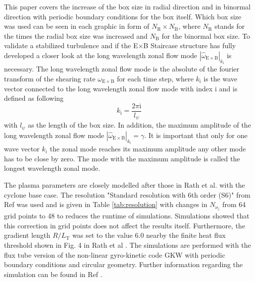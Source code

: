 \documentclass[aip, amsmath, amssymb, reprint, twocolumn]{revtex4-1}
\begin{document}
This paper covers the increase of the box size in radial direction and in binormal direction with periodic boundary conditions for the box itself. Which box size was used can be seen in each graphic in form of $N_\mathrm{R}\times N_\mathrm{B}$, where $N_\mathrm{R}$ stands for the times the radial box size was increased and $N_\mathrm{B}$ for the binormal box size. To validate a stabilized turbulence and if the E$\times$B Staircase structure has fully developed a closer look at the long wavelength zonal flow mode $|\hat{\omega}_{\mathrm{E\times B}}|_{k_\mathrm{i}}$ is necessary. The long wavelength zonal flow mode is the absolute of the fourier transform of the shearing rate $\omega_{\mathrm{E \times B}}$ for each time step, where $k_\mathrm{i}$ is the wave vector connected to the long wavelength zonal flow mode with index i and is defined as following
\begin{equation}
	k_\mathrm{i} = \frac{2\pi \mathrm{i}}{l_\psi}
\end{equation}
with $l_\psi$ as the length of the box size. In addition, the maximum amplitude of the long wavelength zonal flow mode  $|\hat{\omega}_{\mathrm{E\times B}}|_{k_\mathrm{i}} = \gamma $. \cite{doi:10.1063/1.4961231} It is important that only for one wave vector $k_i$ the zonal mode reaches its maximum amplitude any other mode has to be close by zero. The mode with the maximum amplitude is called the longest wavelength zonal mode. \bigskip



The plasma parameters are closely modelled after those in Rath et al. \cite{doi:10.1063/1.4961231} with the cyclone base case.
The resolution "Standard resolution with 6th order (S6)" from Ref  was used and is given in Table \ref{tab:resolution} with changes in $N_{\nu_\parallel}$ from 64 grid points to 48 to reduces the runtime of simulations. Simulations showed that this correction in grid points does not affect the results itself. Furthermore, the gradient length $R/L_\mathrm{T}$ was set to the value 6.0 nearby the finite heat flux threshold shown in Fig. 4 in Rath et al \cite{doi:10.1063/1.4961231}. The simulations are performed with the flux tube version of the non-linear gyro-kinetic code GKW \cite{Peeters20092650} with periodic boundary conditions and circular geometry.
Further information regarding the simulation can be found in Ref .
\end{document}
